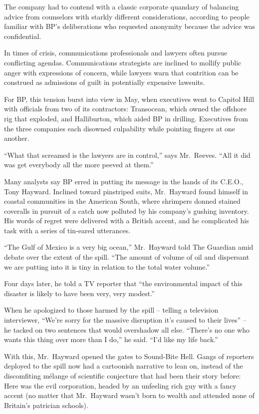 ﻿\documentclass[12pt]{article}
\begin{document}
The company had to contend with a classic corporate quandary of balancing advice from counselors
with starkly different considerations, according to people familiar with BP's deliberations who
requested anonymity because the advice was confidential.

In times of crisis, communications professionals and lawyers often pursue conflicting agendas.
Communications strategists are inclined to mollify public anger with expressions of concern, while
lawyers warn that contrition can be construed as admissions of guilt in potentially expensive
lawsuits.

For BP, this tension burst into view in May, when executives went to Capitol Hill with officials
from two of its contractors: Transocean, which owned the offshore rig that exploded, and
Halliburton, which aided BP in drilling. Executives from the three companies each disowned
culpability while pointing fingers at one another.

``What that screamed is the lawyers are in control,'' says Mr.~Reeves. ``All it did was get
everybody all the more peeved at them.''

Many analysts say BP erred in putting its message in the hands of its C.E.O., Tony Hayward. Inclined
toward pinstriped suits, Mr.~Hayward found himself in coastal communities in the American South,
where shrimpers donned stained coveralls in pursuit of a catch now polluted by his company's gushing
inventory. His words of regret were delivered with a British accent, and he complicated his task
with a series of tin-eared utterances.

``The Gulf of Mexico is a very big ocean,'' Mr.~Hayward told The Guardian amid debate over the
extent of the spill. ``The amount of volume of oil and dispersant we are putting into it is tiny in
relation to the total water volume.''

Four days later, he told a TV reporter that ``the environmental impact of this disaster is likely to
have been very, very modest.''

When he apologized to those harmed by the spill -- telling a television interviewer, ``We're sorry
for the massive disruption it's caused to their lives'' -- he tacked on two sentences that would
overshadow all else. ``There's no one who wants this thing over more than I do,'' he said. ``I'd
like my life back.''

With this, Mr.~Hayward opened the gates to Sound-Bite Hell. Gangs of reporters deployed to the spill
now had a cartoonish narrative to lean on, instead of the discomfiting m\'elange of scientific
conjecture that had been their story before: Here was the evil corporation, headed by an unfeeling
rich guy with a fancy accent (no matter that Mr.~Hayward wasn't born to wealth and attended none of
Britain's patrician schools).
\end{document}
